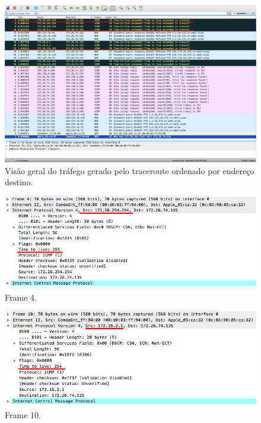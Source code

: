 \documentclass{llncs}
\begin{document}
\begin{figure}[H]
\begin{center}
\includegraphics[scale=0.30]{2_g.png} 
\end{center}
\caption{\label{fig:2_e}Visão geral do tráfego gerado pelo traceroute ordenado por endereço destino.}
\end{figure}

\begin{figure}[H]
\begin{center}
\includegraphics[scale=0.45]{2_g_1.png} 
\end{center}
\caption{\label{fig:2_g_1}Frame 4.}
\end{figure}

\begin{figure}[H]
\begin{center}
\includegraphics[scale=0.45]{2_g_2.png} 
\end{center}
\caption{\label{fig:2_g_2}Frame 10.}
\end{figure}
\end{document}
